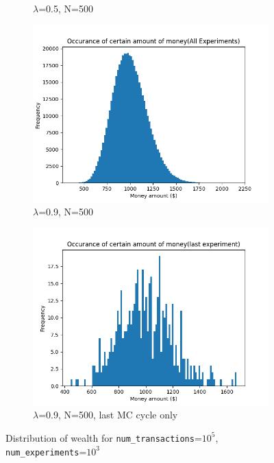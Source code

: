 \documentclass[12pt]{article} %
\begin{document}
\begin{figure}
\begin{subfigure}{0.5\textwidth}
		\caption{$\lambda$=0.5, N=500}
		\label{fig:sav.5}
	\end{subfigure}
	\begin{subfigure}{0.5\textwidth}
		\includegraphics[scale=\scaleResultsB]{sav.9.png}
		\caption{$\lambda$=0.9, N=500}
		\label{fig:sav.9}
	\end{subfigure}
	\begin{subfigure}{0.5\textwidth}
		\includegraphics[scale=\scaleResultsB]{sav.9_last.png}
		\caption{$\lambda$=0.9, N=500, last MC cycle only}
		\label{fig:sav.9_last}
	\end{subfigure}
	\caption{Distribution of wealth for \texttt{num\_transactions}=$10^5$, 
	\texttt{num\_experiments}=$10^3$}
\end{figure}
\end{document}
